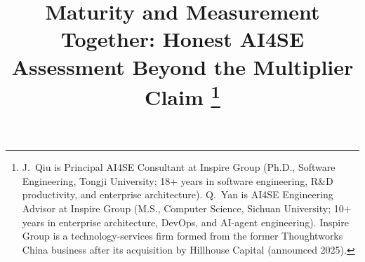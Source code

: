 \documentclass[10pt,conference]{IEEEtran}
\begin{document}
\title{Maturity and Measurement Together: Honest AI4SE Assessment Beyond the Multiplier Claim%
\thanks{J.~Qiu is Principal AI4SE Consultant at Inspire Group (Ph.D., Software Engineering, Tongji University; 18+ years in software engineering, R\&D productivity, and enterprise architecture).
Q.~Yan is AI4SE Engineering Advisor at Inspire Group (M.S., Computer Science, Sichuan University; 10+ years in enterprise architecture, DevOps, and AI-agent engineering).
Inspire Group is a technology-services firm formed from the former Thoughtworks China business after its acquisition by Hillhouse Capital (announced 2025).}}

\author{
}

\maketitle
\end{document}
